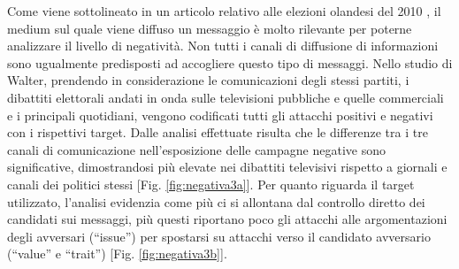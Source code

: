 Come viene sottolineato in un articolo relativo alle elezioni olandesi del 2010 \citep{walter2010}, il medium sul quale viene diffuso un messaggio è molto rilevante per poterne analizzare il livello di negatività. Non tutti i canali di diffusione di informazioni sono ugualmente predisposti ad accogliere questo tipo di messaggi. Nello studio di Walter, prendendo in considerazione le comunicazioni degli stessi partiti, i dibattiti elettorali andati in onda sulle televisioni pubbliche e quelle commerciali e i principali quotidiani, vengono codificati tutti gli attacchi positivi e negativi con i rispettivi target. Dalle analisi effettuate risulta che le differenze tra i tre canali di comunicazione nell’esposizione delle campagne negative sono significative, dimostrandosi più elevate nei dibattiti televisivi rispetto a giornali e canali dei politici stessi [Fig. \ref{fig:negativa3a}]. Per quanto riguarda il target utilizzato, l’analisi evidenzia come più ci si allontana dal controllo diretto dei candidati sui messaggi, più questi riportano poco gli attacchi alle argomentazioni degli avversari (“issue”) per spostarsi su attacchi verso il candidato avversario (“value” e “trait”) [Fig. \ref{fig:negativa3b}].

